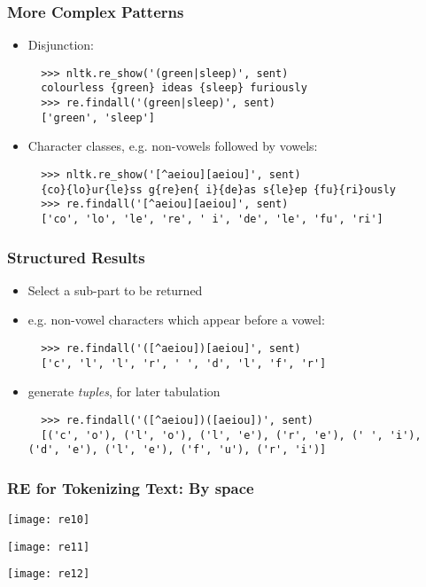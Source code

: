 \begin{frame}[fragile]\frametitle{More Complex Patterns}

\begin{itemize}
\item Disjunction:

{\small
\begin{lstlisting}
  >>> nltk.re_show('(green|sleep)', sent)
  colourless {green} ideas {sleep} furiously
  >>> re.findall('(green|sleep)', sent)
  ['green', 'sleep']
\end{lstlisting}}

\item Character classes, e.g. non-vowels followed by vowels:

{\small
\begin{lstlisting}
  >>> nltk.re_show('[^aeiou][aeiou]', sent)
  {co}{lo}ur{le}ss g{re}en{ i}{de}as s{le}ep {fu}{ri}ously
  >>> re.findall('[^aeiou][aeiou]', sent)
  ['co', 'lo', 'le', 're', ' i', 'de', 'le', 'fu', 'ri']
\end{lstlisting}}
\end{itemize}
\end{frame}

\begin{frame}[fragile]\frametitle{Structured Results}
\begin{itemize}
\item Select a sub-part to be returned
\item e.g. non-vowel characters which appear before a vowel:

{\small
\begin{lstlisting}
  >>> re.findall('([^aeiou])[aeiou]', sent)
  ['c', 'l', 'l', 'r', ' ', 'd', 'l', 'f', 'r']
\end{lstlisting}}

\item generate \textit{tuples}, for later tabulation

{\small
\begin{lstlisting}
  >>> re.findall('([^aeiou])([aeiou])', sent)
  [('c', 'o'), ('l', 'o'), ('l', 'e'), ('r', 'e'), (' ', 'i'), ('d', 'e'), ('l', 'e'), ('f', 'u'), ('r', 'i')]
\end{lstlisting}}
\end{itemize}
\end{frame}

\begin{frame}[fragile]
\frametitle{RE for Tokenizing Text: By space}
\begin{center}
\texttt{[image: re10]}

\texttt{[image: re11]}

\texttt{[image: re12]}
\end{center}
\end{frame}


